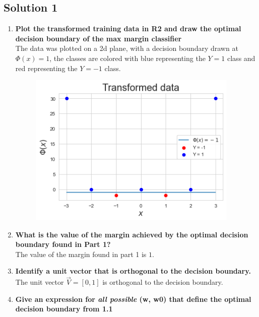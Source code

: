 \documentclass[submit]{harvardml}
\begin{document}
\subsection*{Solution 1}
\begin{enumerate}
    \item \textbf{Plot the transformed training data in R2 and draw the optimal decision boundary of the max margin classifier}\\
    
    The data was plotted on a 2d plane, with a decision boundary drawn at $\Phi (x) = 1$, the classes are colored with blue representing the $ Y = 1$ class and red representing the $Y = -1$ class.
    \begin{figure}[H]
        \includegraphics[width=10cm]{hw4/img/hw4p1.png}
        \centering
    \end{figure}
    
    \item \textbf{What is the value of the margin achieved by the optimal decision boundary found in Part 1?}\\
    
    The value of the margin found in part 1 is $1$.\\
    
    \item \textbf{Identify a unit vector that is orthogonal to the decision boundary.}\\
    
    The unit vector $\vec{V} = [0,1]$ is orthogonal to the decision boundary.\\
    
    \item \textbf{Give an expression for \textit{all possible} (w, w0) that define the optimal decision boundary from 1.1}\\
    

\end{enumerate}
\end{document}
